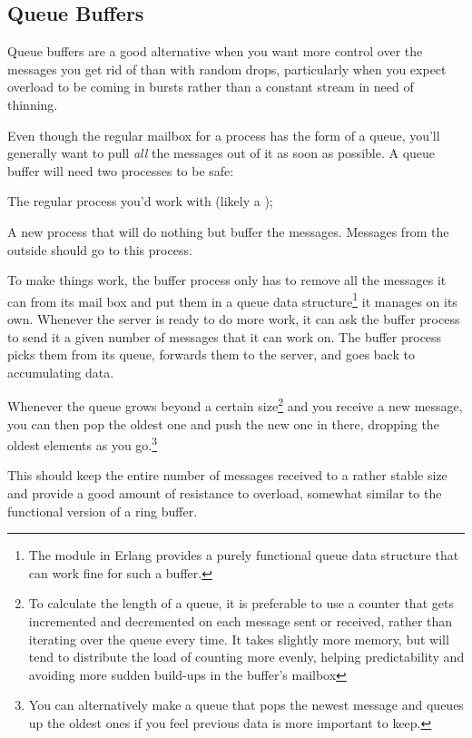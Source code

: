 \subsection{Queue Buffers}

Queue buffers are a good alternative when you want more control over the messages you get rid of than with random drops, particularly when you expect overload to be coming in bursts rather than a constant stream in need of thinning.

Even though the regular mailbox for a process has the form of a queue, you'll generally want to pull \emph{all} the messages out of it as soon as possible. A queue buffer will need two processes to be safe:

\begin{itemize*}
	\item The regular process you'd work with (likely a );
	\item A new process that will do nothing but buffer the messages. Messages from the outside should go to this process.
\end{itemize*}

To make things work, the buffer process only has to remove all the messages it can from its mail box and put them in a queue data structure\footnote{The  module in Erlang provides a purely functional queue data structure that can work fine for such a buffer.} it manages on its own. Whenever the server is ready to do more work, it can ask the buffer process to send it a given number of messages that it can work on. The buffer process picks them from its queue, forwards them to the server, and goes back to accumulating data.

Whenever the queue grows beyond a certain size\footnote{To calculate the length of a queue, it is preferable to use a counter that gets incremented and decremented on each message sent or received, rather than iterating over the queue every time. It takes slightly more memory, but will tend to distribute the load of counting more evenly, helping predictability and avoiding more sudden build-ups in the buffer's mailbox} and you receive a new message, you can then pop the oldest one and push the new one in there, dropping the oldest elements as you go.\footnote{You can alternatively make a queue that pops the newest message and queues up the oldest ones if you feel previous data is more important to keep.}

This should keep the entire number of messages received to a rather stable size and provide a good amount of resistance to overload, somewhat similar to the functional version of a ring buffer.


